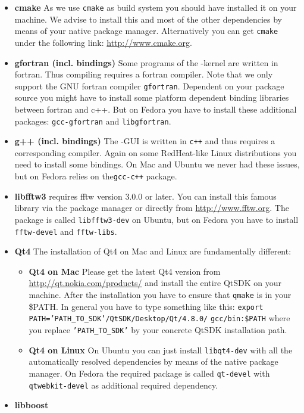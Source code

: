 \begin{itemize}
	\item \textbf{cmake} As we use \texttt{cmake} as build system you should have installed it on your machine. We advise to install this and most of the other dependencies by means of your native package manager. Alternatively you can get \texttt{cmake} under the following link: \url{http://www.cmake.org}.
	 
	\item \textbf{gfortran (incl. bindings)} Some programs of the {\twodx}-kernel are written in fortran. Thus compiling {\twodx} requires a fortran compiler. Note that we only support the GNU fortran compiler \texttt{gfortran}. Dependent on your package source you might have to install some platform dependent binding libraries between fortran and c++. But on Fedora you have to install these additional packages: \texttt{gcc-gfortran} and \texttt{libgfortran}.  
	
	\item \textbf{g++ (incl. bindings)} The {\twodx}-GUI is written in \texttt{c++} and thus requires a corresponding compiler. Again on some RedHeat-like Linux distributions you need to install some bindings. On Mac and Ubuntu we never had these issues, but on Fedora {\twodx} relies on the\texttt{gcc-c++} package.
	
	\item \textbf{libfftw3} {\twodx} requires fftw version 3.0.0 or later. You can install this famous library via the package manager or directly from \url{http://www.fftw.org}. The package is called \texttt{libfftw3-dev} on Ubuntu, but on Fedora you have to install \texttt{fftw-devel} and \texttt{fftw-libs}.

	\item \textbf{Qt4} The installation of Qt4 on Mac and Linux are fundamentally different:
		\begin{itemize}
			\item \textbf{Qt4 on Mac} Please get the latest Qt4 version from \url{http://qt.nokia.com/products/} and install the entire QtSDK on your machine. After the installation you have to ensure that \texttt{qmake} is in your \$PATH. In general you have to type something like this:
			\newline
			\texttt{export PATH='PATH\_TO\_SDK'/QtSDK/Desktop/Qt/4.8.0/} \texttt{gcc/bin:\$PATH} \newline where you replace \texttt{'PATH\_TO\_SDK'} by your concrete QtSDK installation path.
			\item \textbf{Qt4 on Linux} On Ubuntu you can just install \texttt{libqt4-dev} with all the automatically resolved dependencies by means of the native package manager. On Fedora the required package is called \texttt{qt-devel} with \texttt{qtwebkit-devel} as additional required dependency.
		\end{itemize}
		
	\item \textbf{libboost}
\end{itemize}

